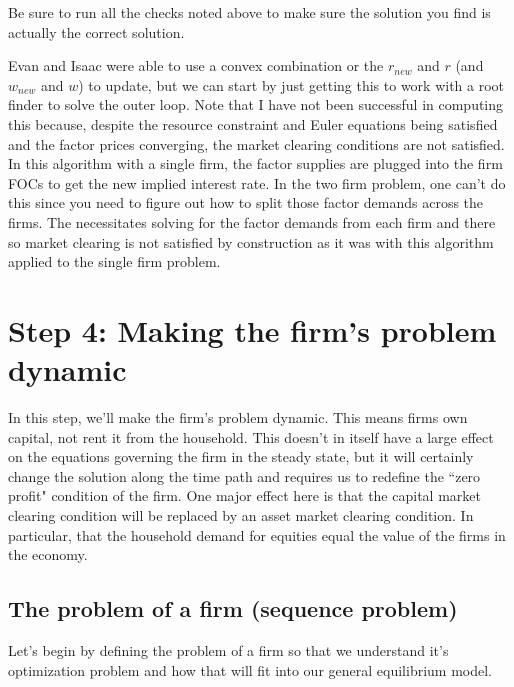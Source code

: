 \documentclass[letterpaper,12pt]{article}
\theoremstyle{definition}
\begin{document}
\begin{spacing}{1.5}
Be sure to run all the checks noted above to make sure the solution you find is actually the correct solution.

Evan and Isaac were able to use a convex combination or the $r_{new}$ and $r$ (and $w_{new}$ and $w$) to update, but we can start by just getting this to work with a root finder to solve the outer loop.  Note that I have not been successful in computing this because, despite the resource constraint and Euler equations being satisfied and the factor prices converging, the market clearing conditions are not satisfied.  In this algorithm with a single firm, the factor supplies are plugged into the firm FOCs to get the new implied interest rate.  In the two firm problem, one can't do this since you need to figure out how to split those factor demands across the firms.  The necessitates solving for the factor demands from each firm and there so market clearing is not satisfied by construction as it was with this algorithm applied to the single firm problem.

\section*{Step 4: Making the firm's problem dynamic}

In this step, we'll make the firm's problem dynamic. This means firms own capital, not rent it from the household.  This doesn't in itself have a large effect on the equations governing the firm in the steady state, but it will certainly change the solution along the time path and requires us to redefine the ``zero profit" condition of the firm. One major effect here is that the capital market clearing condition will be replaced by an asset market clearing condition.  In particular, that the household demand for equities equal the value of the firms in the economy.

\subsection*{The problem of a firm (sequence problem)}

Let's begin by defining the problem of a firm so that we understand it's optimization problem and how that will fit into our general equilibrium model.


\end{spacing}
\end{document}
